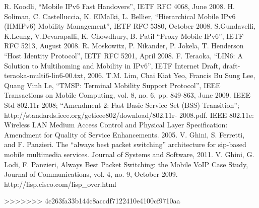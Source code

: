 \begin{thebibliography}{90}
 R. Koodli, ``Mobile IPv6 Fast Handovers'', IETF RFC 4068, June 2008.
  H. Soliman, C. Castelluccia, K. ElMalki, L. Bellier, ``Hierarchical Mobile IPv6 (HMIPv6) Mobility Management'', IETF RFC 5380, October 2008.
 S.Gundavelli, K.Leung, V.Devarapalli, K. Chowdhury, B. Patil ``Proxy Mobile IPv6'', IETF RFC 5213, August 2008.
 R. Moskowitz, P. Nikander, P. Jokela, T. Henderson ``Host Identity Protocol'', IETF RFC 5201, April 2008. 
 F. Teraoka, ``LIN6: A Solution to Multihoming and Mobility in IPv6'', IETF Internet Draft, draft-teraoka-multi6-lin6-00.txt, 2006.
	T.M. Lim, Chai Kiat Yeo, Francis Bu Sung Lee, Quang Vinh Le, ``TMSP: Terminal Mobility Support Protocol'', IEEE Transactions on Mobile Computing, vol. 8, no. 6, pp. 849-863, June 2009.
 IEEE Std 802.11r-2008; ``Amendment 2: Fast Basic Service Set (BSS) Transition''; http://standards.ieee.org/getieee802/download/802.11r- 2008.pdf.
 IEEE 802.11e: Wireless LAN Medium Access Control and Physical Layer Specification: Amendment for Quality of Service Enhancements. 2005.
 V. Ghini, S. Ferretti, and F. Panzieri. The ``always best packet switching'' architecture for sip-based mobile multimedia services. Journal of Systems and Software, 2011.
 V. Ghini, G. Lodi, F. Panzieri, Always Best Packet Switching: the Mobile VoIP Case Study, Journal of Communications, vol. 4, no. 9, October 2009.
 http://lisp.cisco.com/lisp\_over.html
\end{thebibliography}
>>>>>>> 4c263fa33b144c8accdf7122410e4100cf9710aa
